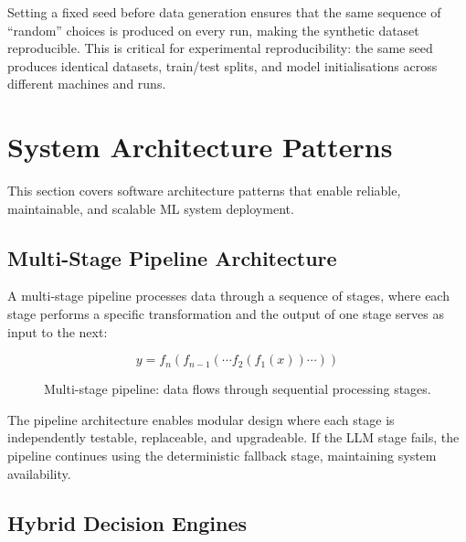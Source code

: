 \documentclass[10pt,a4paper]{article}
\begin{document}
Setting a fixed seed before data generation ensures that the same sequence of ``random'' choices is produced on every run, making the synthetic dataset reproducible. This is critical for experimental reproducibility: the same seed produces identical datasets, train/test splits, and model initialisations across different machines and runs.

\section{System Architecture Patterns}
\label{sec:architecture-patterns}

This section covers software architecture patterns that enable reliable, maintainable, and scalable ML system deployment.

\subsection{Multi-Stage Pipeline Architecture}
\label{sec:pipeline-architecture}

A multi-stage pipeline processes data through a sequence of stages, where each stage performs a specific transformation and the output of one stage serves as input to the next:

\begin{equation}
y = f_n(f_{n-1}(\cdots f_2(f_1(x))\cdots))
\label{eq:pipeline-composition}
\end{equation}

\begin{figure}[H]
    \centering
    \caption{Multi-stage pipeline: data flows through sequential processing stages.}
    \label{fig:pipeline-architecture}
\end{figure}

The pipeline architecture enables modular design where each stage is independently testable, replaceable, and upgradeable. If the LLM stage fails, the pipeline continues using the deterministic fallback stage, maintaining system availability.

\subsection{Hybrid Decision Engines}
\label{sec:hybrid-engines}
\end{document}
